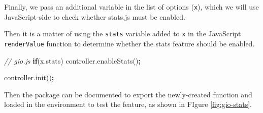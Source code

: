 \documentclass[10pt,]{krantz}
\makeatletter
\newenvironment{Shaded}{\begin{snugshade}}{\end{snugshade}}
\newcommand{\AttributeTok}[1]{\textcolor[rgb]{0.61,0.61,0.61}{#1}}
\newcommand{\CommentTok}[1]{\textcolor[rgb]{0.37,0.37,0.37}{\textit{#1}}}
\newcommand{\ControlFlowTok}[1]{\textcolor[rgb]{0.27,0.27,0.27}{\textbf{#1}}}
\newcommand{\DataTypeTok}[1]{\textcolor[rgb]{0.27,0.27,0.27}{#1}}
\newcommand{\KeywordTok}[1]{\textcolor[rgb]{0.27,0.27,0.27}{\textbf{#1}}}
\newcommand{\NormalTok}[1]{#1}
\newcommand{\OperatorTok}[1]{\textcolor[rgb]{0.43,0.43,0.43}{\textbf{#1}}}
\newcommand{\OtherTok}[1]{\textcolor[rgb]{0.37,0.37,0.37}{#1}}
\newcommand{\StringTok}[1]{\textcolor[rgb]{0.5,0.5,0.5}{#1}}
\newcommand{\VariableTok}[1]{\textcolor[rgb]{0,0,0}{#1}}
\newenvironment{kframe}{%
\medskip{}
\setlength{\fboxsep}{.8em}
 \def\at@end@of@kframe{}%
 \ifinner\ifhmode%
  \def\at@end@of@kframe{\end{minipage}}%
  \begin{minipage}{\columnwidth}%
 \fi\fi%
 \def\FrameCommand##1{\hskip\@totalleftmargin \hskip-\fboxsep
 \colorbox{shadecolor}{##1}\hskip-\fboxsep
     \hskip-\linewidth \hskip-\@totalleftmargin \hskip\columnwidth}%
 \MakeFramed {\advance\hsize-\width
   \@totalleftmargin\z@ \linewidth\hsize
   \@setminipage}}%
 {\par\unskip\endMakeFramed%
 \at@end@of@kframe}
\renewenvironment{Shaded}{\begin{kframe}}{\end{kframe}}
\makeatother
\begin{document}
Finally, we pass an additional variable in the list of options (\texttt{x}), which we will use JavaScript-side to check whether stats.js must be enabled.

\begin{Shaded}
\end{Shaded}

Then it is a matter of using the \texttt{stats} variable added to \texttt{x} in the JavaScript \texttt{renderValue} function to determine whether the stats feature should be enabled.

\begin{Shaded}
\begin{Highlighting}[]
\CommentTok{// gio.js}
\ControlFlowTok{if}\NormalTok{(}\VariableTok{x}\NormalTok{.}\AttributeTok{stats}\NormalTok{)}
  \VariableTok{controller}\NormalTok{.}\AttributeTok{enableStats}\NormalTok{()}\OperatorTok{;}

\VariableTok{controller}\NormalTok{.}\AttributeTok{init}\NormalTok{()}\OperatorTok{;}
\end{Highlighting}
\end{Shaded}

Then the package can be documented to export the newly-created function and loaded in the environment to test the feature, as shown in FIgure \ref{fig:gio-stats}.
\end{document}
